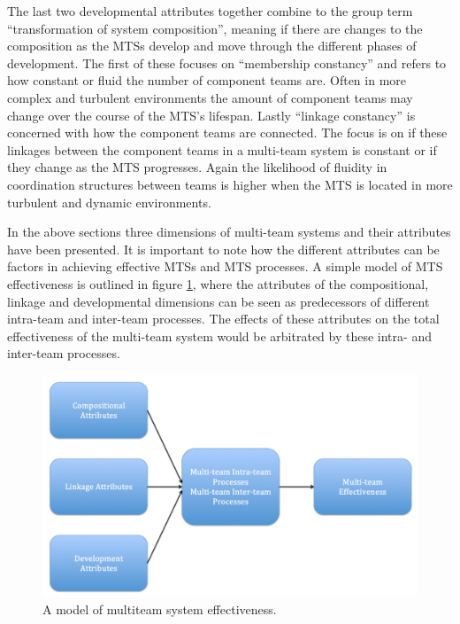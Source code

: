 The last two developmental attributes together combine to the group term ``transformation of system composition'', meaning if there are changes to the composition as the MTSs develop and move through the different phases of development. The first of these focuses on ``membership constancy'' and refers to how constant or fluid the number of component teams are. Often in more complex and turbulent environments the amount of component teams may change over the course of the MTS's lifespan. Lastly ``linkage constancy'' is concerned with how the component teams are connected. The focus is on if these linkages between the component teams in a multi-team system is constant or if they change as the MTS progresses. Again the likelihood of fluidity in coordination structures between teams is higher when the MTS is located in more turbulent and dynamic environments.

In the above sections three dimensions of multi-team systems and their attributes have been presented. It is important to note how the different attributes can be factors in achieving effective MTSs and MTS processes. A simple model of MTS effectiveness is outlined in figure \ref{amomse}, where the attributes of the compositional, linkage and developmental dimensions can be seen as predecessors of different intra-team and inter-team processes. The effects of these attributes on the total effectiveness of the multi-team system would be arbitrated by these intra- and inter-team processes.


\begin{figure}
\centering
\includegraphics[trim = 0mm 0mm 0mm 0mm, width=\textwidth]{images/multiteam_system_model.png}
\caption{A model of multiteam system effectiveness.}
\label{amomse}
\end{figure}

